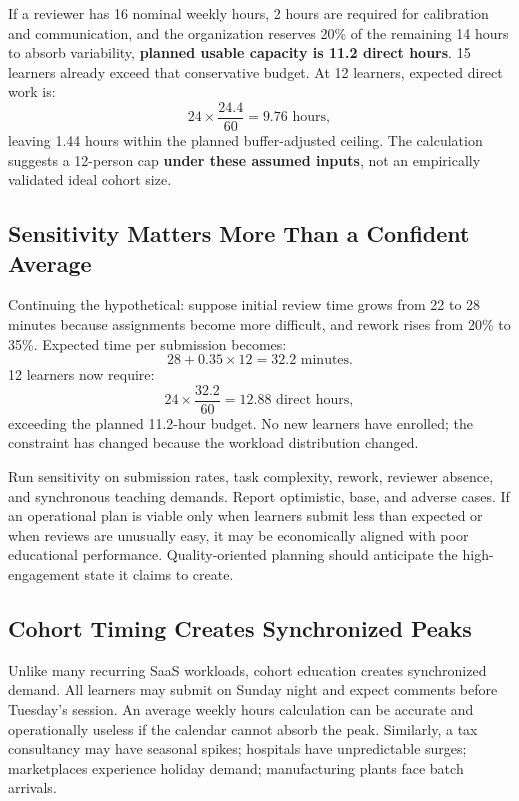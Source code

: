 If a reviewer has 16 nominal weekly hours, 2 hours are required for calibration and communication, and the organization reserves 20\% of the remaining 14 hours to absorb variability, \textbf{planned usable capacity is 11.2 direct hours}. 15 learners already exceed that conservative budget. At 12 learners, expected direct work is:
\begin{equation}
24 \times \frac{24.4}{60} = 9.76\text{ hours},
\end{equation}
leaving 1.44 hours within the planned buffer-adjusted ceiling. The calculation suggests a 12-person cap \textbf{under these assumed inputs}, not an empirically validated ideal cohort size.

\subsection{Sensitivity Matters More Than a Confident Average}
\label{sec:sensitivity_vs_confident_average}

Continuing the hypothetical: suppose initial review time grows from 22 to 28 minutes because assignments become more difficult, and rework rises from 20\% to 35\%. Expected time per submission becomes:
\begin{equation}
28 + 0.35 \times 12 = 32.2\text{ minutes}.
\end{equation}
12 learners now require:
\begin{equation}
24 \times \frac{32.2}{60} = 12.88\text{ direct hours},
\end{equation}
exceeding the planned 11.2-hour budget. No new learners have enrolled; the constraint has changed because the workload distribution changed.

Run sensitivity on submission rates, task complexity, rework, reviewer absence, and synchronous teaching demands. Report optimistic, base, and adverse cases. If an operational plan is viable only when learners submit less than expected or when reviews are unusually easy, it may be economically aligned with poor educational performance. Quality-oriented planning should anticipate the high-engagement state it claims to create.

\subsection{Cohort Timing Creates Synchronized Peaks}
\label{sec:cohort_timing_synchronized_peaks}

Unlike many recurring SaaS workloads, cohort education creates synchronized demand. All learners may submit on Sunday night and expect comments before Tuesday's session. An average weekly hours calculation can be accurate and operationally useless if the calendar cannot absorb the peak. Similarly, a tax consultancy may have seasonal spikes; hospitals have unpredictable surges; marketplaces experience holiday demand; manufacturing plants face batch arrivals.

